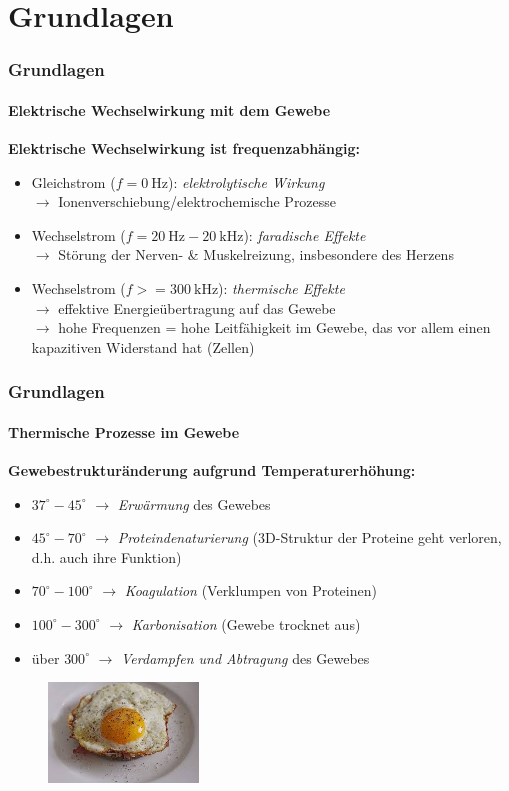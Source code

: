 \documentclass{beamer}
\begin{document}
\section{Grundlagen}
\begin{frame}
\frametitle{Grundlagen}
\framesubtitle{Elektrische Wechselwirkung mit dem Gewebe}
\textbf{Elektrische Wechselwirkung ist frequenzabhängig:}
\vspace{0.5cm}
\begin{itemize}
	\item Gleichstrom ($f=\SI{0}{\hertz}$): \emph{elektrolytische Wirkung} \\$\rightarrow$ Ionenverschiebung/elektrochemische Prozesse
	\vspace{0.2cm}
	\item Wechselstrom ($f=\SI{20}{\hertz}-\SI{20}{\kilo\hertz}$): \emph{faradische Effekte}
	\\$\rightarrow$ Störung der Nerven- \& Muskelreizung, insbesondere des Herzens
	\vspace{0.2cm}
	\item Wechselstrom ($f>=\SI{300}{\kilo\hertz}$): \emph{thermische Effekte}
	\\$\rightarrow$ effektive Energieübertragung auf das Gewebe
	\\$\rightarrow$ hohe Frequenzen = hohe Leitfähigkeit im Gewebe, das vor allem einen kapazitiven Widerstand hat (Zellen)
\end{itemize}
\end{frame}



\begin{frame}
\frametitle{Grundlagen}
\framesubtitle{Thermische Prozesse im Gewebe}
\textbf{Gewebestrukturänderung aufgrund Temperaturerhöhung:}
	\begin{itemize}
		\item $37^\circ-45^\circ$ $\rightarrow$ \emph{Erwärmung} des Gewebes
		\item $45^\circ-70^\circ$ $\rightarrow$ \emph{Proteindenaturierung} (3D-Struktur der Proteine geht verloren, d.h. auch ihre Funktion)
		\item $70^\circ-100^\circ$ $\rightarrow$ \emph{Koagulation} (Verklumpen von Proteinen)
		\item $100^\circ-300^\circ$ $\rightarrow$ \emph{Karbonisation} (Gewebe trocknet aus)
		\item über $300^\circ$ $\rightarrow$ \emph{Verdampfen und Abtragung} des Gewebes
	\end{itemize}
	\begin{figure}
		\centering
		\includegraphics[width=4cm]{images/spiegelei.png}
	\end{figure}
\end{frame}
\end{document}
